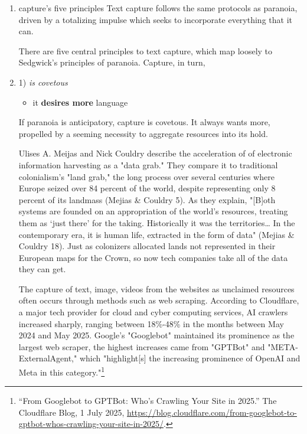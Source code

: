 \documentclass[11pt]{article}
\begin{document}
\begin{enumerate}
Sedgwick's project is so much about what to do with knowledge, about
orientations around knowledge as evidence. In \emph{Epistemology} and
\emph{Tendencies}, she discusses how antihomophobic disource weaponizes
ignorance to deny human rights and neglect human life. Sedgwick says,
"the power of our enemies over us is implicated, not in their command
of knowledge, but precisely in their ignorance" (\emph{Tendencies} 24).

\item capture's five principles
\label{sec:org0b57ec5}
Text capture follows the same protocols as paranoia, driven by a
totalizing impulse which seeks to incorporate everything that it can.

There are five central principles to text capture, which map loosely
to Sedgwick's principles of paranoia. Capture, in turn,

\item 1) \emph{is covetous}
\label{sec:org5d1bb21}
\begin{itemize}
\item it \textbf{desires more} language
\end{itemize}

If paranoia is anticipatory, capture is covetous. It always wants
more, propelled by a seeming necessity to aggregate resources into its
hold.

Ulises A. Meijas and Nick Couldry describe the acceleration of of
electronic information harvesting as a "data grab." They compare it to
traditional colonialism's "land grab," the long process over several
centuries where Europe seized over 84 percent of the world, despite
representing only 8 percent of its landmass (Mejias \& Couldry 5). As
they explain, "[B]oth systems are founded on an appropriation of the
world’s resources, treating them as ‘just there’ for the taking.
Historically it was the territories\ldots{} In the contemporary era, it is
human life, extracted in the form of data" (Mejias \& Couldry 18). Just
as colonizers allocated lands not represented in their European maps
for the Crown, so now tech companies take all of the data they can
get.

The capture of text, image, videos from the websites as unclaimed
resources often occurs through methods such as web scraping. According
to Cloudflare, a major tech provider for cloud and cyber computing
services, AI crawlers increased sharply, ranging between 18\%-48\% in
the months between May 2024 and May 2025. Google's "Googlebot"
maintained its prominence as the largest web scraper, the highest
increases came from "GPTBot" and "META-ExternalAgent," which
"highlight[s] the increasing prominence of OpenAI and Meta in this
category."\footnote{“From Googlebot to GPTBot: Who’s Crawling Your Site in 2025.”
The Cloudflare Blog, 1 July 2025,
\url{https://blog.cloudflare.com/from-googlebot-to-gptbot-whos-crawling-your-site-in-2025/}.}


\end{enumerate}
\end{document}

